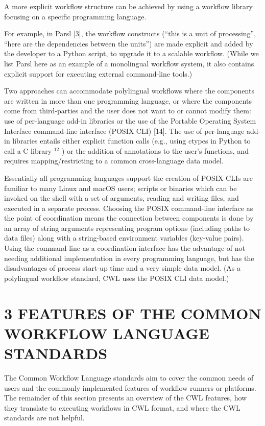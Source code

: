 \documentclass[
]{article}
\begin{document}
A more explicit workflow structure can be achieved by using a workflow
library focusing on a specific programming language.

For example, in Parsl {[}3{]}, the workflow constructs (``this is a unit
of processing'', ``here are the dependencies between the units'') are
made explicit and added by the developer to a Python script, to upgrade
it to a scalable workflow. (While we list Parsl here as an example of a
monolingual workflow system, it also contains explicit support for
executing external command-line tools.)

Two approaches can accommodate polylingual workflows where the
components are written in more than one programming language, or where
the components come from third-parties and the user does not want to or
cannot modify them: use of per-language add-in libraries or the use of
the Portable Operating System Interface command-line interface (POSIX
CLI) {[}14{]}. The use of per-language add-in libraries entails either
explicit function calls (e.g., using ctypes in Python to call a C
library \(^{12}\) ) or the addition of annotations to the user's
functions, and requires mapping/restricting to a common cross-language
data model.

Essentially all programming languages support the creation of POSIX CLIs
are familiar to many Linux and macOS users; scripts or binaries which
can be invoked on the shell with a set of arguments, reading and writing
files, and executed in a separate process. Choosing the POSIX
command-line interface as the point of coordination means the connection
between components is done by an array of string arguments representing
program options (including paths to data files) along with a
string-based environment variables (key-value pairs). Using the
command-line as a coordination interface has the advantage of not
needing additional implementation in every programming language, but has
the disadvantages of process start-up time and a very simple data model.
(As a polylingual workflow standard, CWL uses the POSIX CLI data model.)

\section{3 FEATURES OF THE COMMON WORKFLOW LANGUAGE
STANDARDS}\label{features-of-the-common-workflow-language-standards}

The Common Workflow Language standards aim to cover the common needs of
users and the commonly implemented features of workflow runners or
platforms. The remainder of this section presents an overview of the CWL
features, how they translate to executing workflows in CWL format, and
where the CWL standards are not helpful.
\end{document}
